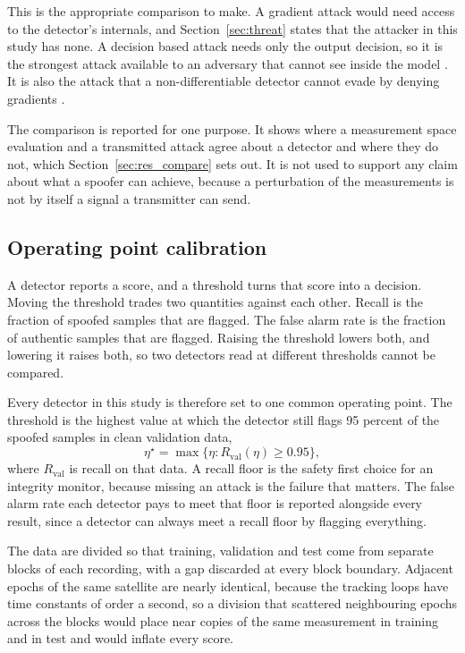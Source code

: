 This is the appropriate comparison to make. A gradient attack would need access to the
detector's internals, and Section~\ref{sec:threat} states that the attacker in this study
has none. A decision based attack needs only the output decision, so it is the strongest
attack available to an adversary that cannot see inside the model
\citep{brendel2018decision,chen2020hopskipjump}. It is also the attack that a
non-differentiable detector cannot evade by denying gradients
\citep{athalye2018obfuscated}.

The comparison is reported for one purpose. It shows where a measurement space
evaluation and a transmitted attack agree about a detector and where they do not, which
Section~\ref{sec:res_compare} sets out. It is not used to support any claim about what a
spoofer can achieve, because a perturbation of the measurements is not by itself a signal
a transmitter can send.

\subsection{Operating point calibration}
\label{sec:oppoint}

A detector reports a score, and a threshold turns that score into a decision. Moving the
threshold trades two quantities against each other. Recall is the fraction of spoofed
samples that are flagged. The false alarm rate is the fraction of authentic samples that
are flagged. Raising the threshold lowers both, and lowering it raises both, so two
detectors read at different thresholds cannot be compared.

Every detector in this study is therefore set to one common operating point. The
threshold is the highest value at which the detector still flags 95 percent of the
spoofed samples in clean validation data,
\begin{equation}
\eta^\star = \max\{\eta : R_\mathrm{val}(\eta) \ge 0.95\},
\label{eq:oppoint}
\end{equation}
where $R_\mathrm{val}$ is recall on that data. A recall floor is the safety first choice
for an integrity monitor, because missing an attack is the failure that matters. The
false alarm rate each detector pays to meet that floor is reported alongside every
result, since a detector can always meet a recall floor by flagging everything.

The data are divided so that training, validation and test come from separate blocks of
each recording, with a gap discarded at every block boundary. Adjacent epochs of the same
satellite are nearly identical, because the tracking loops have time constants of order a
second, so a division that scattered neighbouring epochs across the blocks would place
near copies of the same measurement in training and in test and would inflate every
score.
